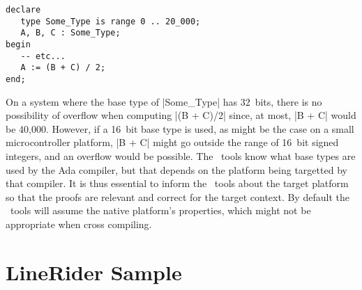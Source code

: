\begin{lstlisting}
declare
   type Some_Type is range 0 .. 20_000;
   A, B, C : Some_Type;
begin
   -- etc...
   A := (B + C) / 2;
end;
\end{lstlisting}

On a system where the base type of |Some_Type| has 32~bits, there is no possibility of overflow
when computing |(B + C)/2| since, at most, |B + C| would be 40,000. However, if a 16~bit base
type is used, as might be the case on a small microcontroller platform, |B + C| might go outside
the range of 16~bit signed integers, and an overflow would be possible. The \SPARK\ tools know
what base types are used by the Ada compiler, but that depends on the platform being targetted
by that compiler. It is thus essential to inform the \SPARK\ tools about the target platform so
that the proofs are relevant and correct for the target context. By default the \SPARK\ tools
will assume the native platform's properties, which might not be appropriate when cross
compiling.


\section{LineRider Sample}
\label{sec:linerider-sample}

